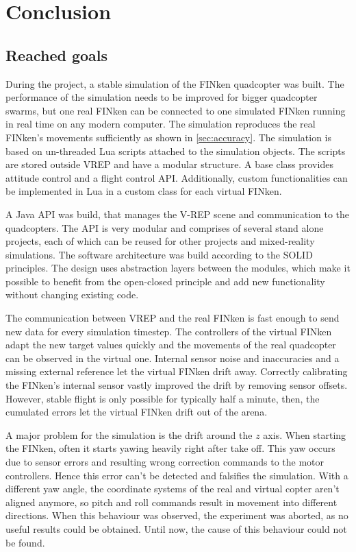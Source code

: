 \chapter{Conclusion}
\label{sec:conclusion}

\section{Reached goals}
During the project, a stable simulation of the FINken quadcopter was built.
The performance of the simulation needs to be improved for bigger quadcopter swarms, but one real FINken can be connected to one simulated FINken running in real time on any modern computer.
The simulation reproduces the real FINken's movements sufficiently as shown in \ref{sec:accuracy}.
The simulation is based on un-threaded Lua scripts attached to the simulation objects.
The scripts are stored outside VREP and have a modular structure.
A base class provides attitude control and a flight control API.
Additionally, custom functionalities can be implemented in Lua in a custom class for each virtual FINken.


A Java API was build, that manages the V-REP scene and communication to the quadcopters. 
The API is very modular and comprises of several stand alone projects, each of which can be reused for other projects and mixed-reality simulations. The software architecture was build according to the  SOLID \cite{solid} principles.
The design uses abstraction layers between the modules, which make it possible to benefit from the open-closed principle and add new functionality without changing existing code.

The communication between VREP and the real FINken is fast enough to send new data for every simulation timestep.
The controllers of the virtual FINken adapt the new target values quickly and the movements of the real quadcopter can be observed in the virtual one.
Internal sensor noise and inaccuracies and a missing external reference let the virtual FINken drift away.
Correctly calibrating the FINken's internal sensor vastly improved the drift by removing sensor offsets.
However, stable flight is only possible for typically half a minute, then, the cumulated errors let the virtual FINken drift out of the arena.

A major problem for the simulation is the drift around the $z$ axis.
When starting the FINken, often it starts yawing heavily right after take off.
This yaw occurs due to sensor errors and resulting wrong correction commands to the motor controllers.
Hence this error can't be detected and falsifies the simulation.
With a different yaw angle, the coordinate systems of the real and virtual copter aren't aligned anymore, so pitch and roll commands result in movement into different directions.
When this behaviour was observed, the experiment was aborted, as no useful results could be obtained.
Until now, the cause of this behaviour could not be found.





